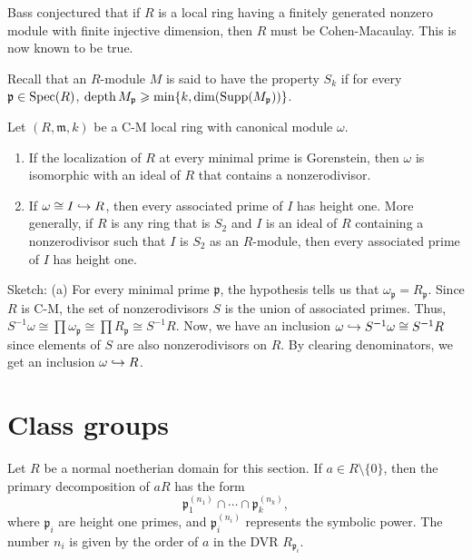 \documentclass[12pt]{article}
\begin{document}
\begin{rem}
	Bass conjectured that if $R$ is a local ring having a finitely generated nonzero module with finite injective dimension, then $R$ must be Cohen-Macaulay. \newline
	This is now known to be true.
\end{rem}

Recall that an $R$-module $M$ is said to have the property $S_{k}$ if for every $\mathfrak{p} \in \operatorname{Spec}(R)$, $\operatorname{depth} M_{\mathfrak{p}} \geqslant \min\{k, \dim(\operatorname{Supp}(M_{\mathfrak{p}}))\}$.
\begin{thm}
	Let $(R, \mathfrak{m}, k)$ be a C-M local ring with canonical module $\omega$.
	\begin{enumerate}[label=(\alph*)]
		\item If the localization of $R$ at every minimal prime is Gorenstein, then $\omega$ is isomorphic with an ideal of $R$ that contains a nonzerodivisor.
		\item If $\omega \cong I \hookrightarrow R$, then every associated prime of $I$ has height one. More generally, if $R$ is any ring that is $S_{2}$ and $I$ is an ideal of $R$ containing a nonzerodivisor such that $I$ is $S_{2}$ as an $R$-module, then every associated prime of $I$ has height one.
	\end{enumerate}
\end{thm}
Sketch: (a) For every minimal prime $\mathfrak{p}$, the hypothesis tells us that $\omega_{\mathfrak{p}} = R_{\mathfrak{p}}$. Since $R$ is C-M, the set of nonzerodivisors $S$ is the union of associated primes. Thus, $S^{-1}\omega \cong \prod \omega_{\mathfrak{p}} \cong \prod R_{\mathfrak{p}} \cong S^{-1}R$. Now, we have an inclusion $\omega \hookrightarrow S^{-1}\omega \cong S^{-1}R$ since elements of $S$ are also nonzerodivisors on $R$. By clearing denominators, we get an inclusion $\omega \hookrightarrow R$. 

\section{Class groups}

Let $R$ be a normal noetherian domain for this section. If $a \in R \setminus \{0\}$, then the primary decomposition of $aR$ has the form
\begin{equation} \label{eq:006}
	\mathfrak{p}_{1}^{(n_{1})} \cap \cdots \cap \mathfrak{p}_{k}^{(n_{k})},
\end{equation}
where $\mathfrak{p}_{i}$ are height one primes, and $\mathfrak{p}_{i}^{(n_{i})}$ represents the symbolic power. The number $n_{i}$ is given by the order of $a$ in the DVR $R_{\mathfrak{p}_{i}}$. 
\end{document}
